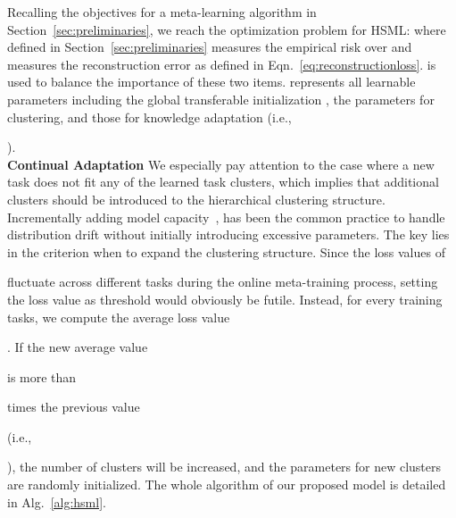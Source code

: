 \documentclass{article}
\begin{document}
Recalling the objectives for a meta-learning algorithm in Section~\ref{sec:preliminaries}, we reach the optimization problem for HSML: 
where  defined in Section~\ref{sec:preliminaries} measures the empirical risk over  and  measures the reconstruction error as defined in Eqn.~\eqref{eq:reconstructionloss}.
 is used to balance the importance of these two items. 
 represents 
all learnable parameters including the global transferable initialization , the parameters for clustering, and those for knowledge adaptation (i.e., \begin{small}\end{small}).
\\
\textbf{Continual Adaptation}
We especially pay attention to the case where a new task does not fit any of the learned task clusters, which implies that 
additional clusters should be introduced to the 
hierarchical clustering 
structure. Incrementally adding model capacity~\cite{yoon2017lifelong,daniely2015strongly}, has been the common practice to handle distribution drift without initially introducing excessive
parameters. 
The key lies in the criterion when to expand the clustering structure. 
Since the loss values of \begin{small}

\end{small}
fluctuate 
across different tasks 
during the online meta-training process, setting the loss value as threshold would obviously be futile.
Instead, for every  training tasks, we compute the average loss value \begin{small}\end{small}. 
If the new average value \begin{small}\end{small} is more than \begin{small}\end{small} times the previous value \begin{small}\end{small} (i.e., \begin{small}\end{small}), the number of clusters will be increased, and the parameters for new clusters are randomly initialized. The whole algorithm of our proposed model is detailed in Alg.~\ref{alg:hsml}.
\end{document}
